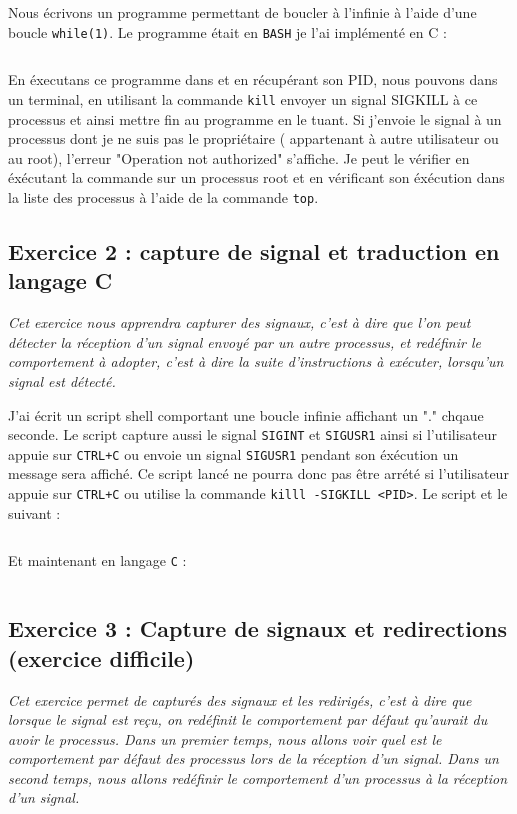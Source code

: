 Nous écrivons un programme permettant de boucler à l'infinie à l'aide d'une boucle \texttt{while(1)}. Le programme était en \texttt{BASH} je l'ai implémenté en C :
\inputminted[linenos,firstline=8,lastline=14]{cpp}{../sources/cpp/TP5-6/ex1.c}

En éxecutans ce programme dans et en récupérant son PID, nous pouvons dans un terminal, en utilisant la commande \texttt{kill} envoyer un signal SIGKILL à ce processus et ainsi mettre fin au programme en le tuant. Si j'envoie le signal à un processus dont je ne suis pas le propriétaire ( appartenant à autre utilisateur ou au root), l'erreur "Operation not authorized" s'affiche. Je peut le vérifier en éxécutant la commande sur un processus root et en vérificant son éxécution dans la liste des processus à l'aide de la commande \texttt{top}.

\subsection{Exercice 2 : capture de signal et traduction en langage C}
\textit{Cet exercice nous apprendra capturer des signaux, c’est à dire que l’on peut détecter la réception d’un signal envoyé par un autre processus, et redéfinir le comportement à adopter, c’est à dire la suite d’instructions à exécuter, lorsqu’un signal est détecté.}

J'ai écrit un script shell comportant une boucle infinie affichant un "." chqaue seconde. Le script capture aussi le signal \texttt{SIGINT} et \texttt{SIGUSR1} ainsi si l'utilisateur appuie sur \texttt{CTRL+C} ou envoie un signal \texttt{SIGUSR1} pendant son éxécution un message sera affiché. Ce script lancé ne pourra donc pas être arrété si l'utilisateur appuie sur \texttt{CTRL+C} ou utilise la commande \texttt{killl -SIGKILL <PID>}.
Le script et le suivant :
\inputminted{bash}{../sources/cpp/TP5-6/ex2-boucle.sh}
Et maintenant en langage \texttt{C} :
\inputminted[linenos,firstline=10,lastline=32]{cpp}{../sources/cpp/TP5-6/ex2.c}

\subsection{Exercice 3 : Capture de signaux et redirections (exercice difficile)}
\textit{Cet exercice permet de capturés des signaux et les redirigés, c’est à dire que lorsque le signal est reçu, on redéfinit le comportement par défaut qu’aurait du avoir le processus. Dans un premier temps, nous allons voir quel est le comportement par défaut des processus lors de la réception d’un signal. Dans un  second temps, nous allons redéfinir le comportement d’un processus à la réception d’un signal.}

